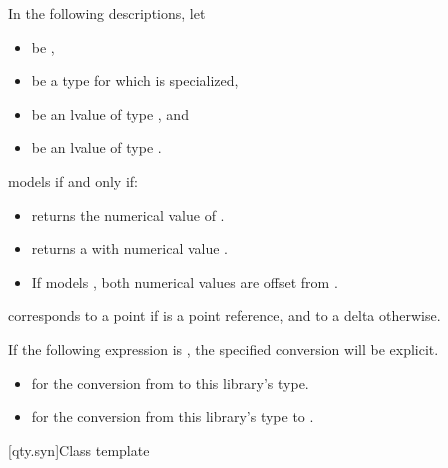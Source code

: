 \pnum
In the following descriptions, let
\begin{itemize}
\item
{} be ,
\item
{} be a type for which  is specialized,
\item
{} be an lvalue of type , and
\item
{} be an lvalue of type .
\end{itemize}

\pnum
{} models  if and only if:
\begin{itemize}
\item
{} returns the numerical value of .
\item
{} returns a  with numerical value .
\item
If  models ,
both numerical values are offset from .
\end{itemize}
\begin{note}
 corresponds to a point if  is a point reference,
and to a delta otherwise.
\end{note}

\pnum
If the following expression is , the specified conversion will be explicit.
\begin{itemize}
\item
{} for the conversion from  to this library's type.
\item
{} for the conversion from this library's type to .
\end{itemize}

[qty.syn]{Class template }


